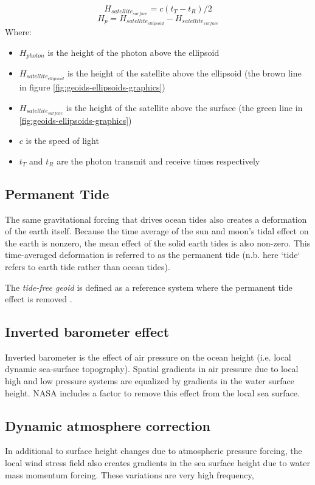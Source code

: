 \begin{equation}\label{eq:raw_photon_calculation}
      H_{satellite_{surface}} = c(t_T-t_R)/2
\end{equation}
\begin{equation}
      H_p = H_{satellite_{ellipsoid}} - H_{satellite_{surface}}
\end{equation}
Where:
\begin{itemize}
      \item $H_{photon}$ is the height of the photon above the ellipsoid
      \item $H_{satellite_{ellipsoid}}$ is the height of the satellite above the ellipsoid (the brown line in figure \ref{fig:geoids-ellipsoids-graphics})
      \item $H_{satellite_{surface}}$ is the height of the satellite above the surface (the green line in \ref{fig:geoids-ellipsoids-graphics})
      \item $c$ is the speed of light
      \item $t_T$ and $t_R$ are the photon transmit and receive times respectively
\end{itemize}

\subsection{Permanent Tide}
The same gravitational forcing that drives ocean tides also creates a deformation of the earth itself. Because the time average of the sun and moon's tidal effect on the earth is nonzero, the mean effect of the solid earth tides is also non-zero. This time-averaged deformation is referred to as the permanent tide (n.b. here `tide` refers to earth tide rather than ocean tides).

The \emph{tide-free geoid} is defined as a reference system where the permanent tide effect is removed \parencite{Makinen2009}.


\subsection{Inverted barometer effect}
Inverted barometer is the effect of air pressure on the ocean height (i.e. local dynamic sea-surface topography)\parencite{Robbins2022}. Spatial gradients in air pressure due to local high and low pressure systems are equalized by gradients in the water surface height. NASA includes a factor to remove this effect from the local sea surface.

\subsection{Dynamic atmosphere correction}
In additional to surface height changes due to atmospheric pressure forcing, the local wind stress field also creates gradients in the sea surface height due to water mass momentum forcing. These variations are very high frequency,

